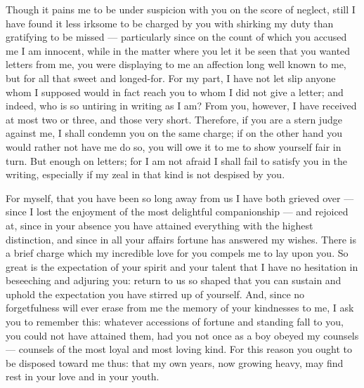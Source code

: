 

 Though it pains me to be under suspicion with you on the score of neglect, still I have found it less irksome to be charged by you with shirking my duty than gratifying to be missed --- particularly since on the count of which you accused me I am innocent, while in the matter where you let it be seen that you wanted letters from me, you were displaying to me an affection long well known to me, but for all that sweet and longed-for. For my part, I have not let slip anyone whom I supposed would in fact reach you to whom I did not give a letter; and indeed, who is so untiring in writing as I am? From you, however, I have received at most two or three, and those very short. Therefore, if you are a stern judge against me, I shall condemn you on the same charge; if on the other hand you would rather not have me do so, you will owe it to me to show yourself fair in turn. But enough on letters; for I am not afraid I shall fail to satisfy you in the writing, especially if my zeal in that kind is not despised by you.

 For myself, that you have been so long away from us I have both grieved over --- since I lost the enjoyment of the most delightful companionship --- and rejoiced at, since in your absence you have attained everything with the highest distinction, and since in all your affairs fortune has answered my wishes. There is a brief charge which my incredible love for you compels me to lay upon you. So great is the expectation of your spirit and your talent that I have no hesitation in beseeching and adjuring you: return to us so shaped that you can sustain and uphold the expectation you have stirred up of yourself. And, since no forgetfulness will ever erase from me the memory of your kindnesses to me, I ask you to remember this: whatever accessions of fortune and standing fall to you, you could not have attained them, had you not once as a boy obeyed my counsels --- counsels of the most loyal and most loving kind. For this reason you ought to be disposed toward me thus: that my own years, now growing heavy, may find rest in your love and in your youth.
